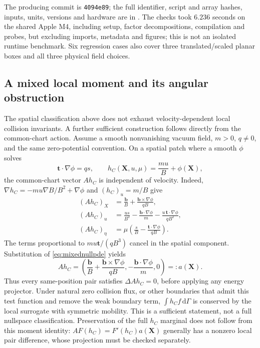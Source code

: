 \documentclass[11pt,letterpaper]{article}
\newcommand{\dd}{\mathrm d}
\newcommand{\X}{\mathbf X}
\begin{document}
The producing commit is \texttt{4094e89}; the full identifier, script and
array hashes, inputs, units, versions and hardware are in
. The checks took
$6.236$ seconds on the shared Apple M4, including setup, factor decompositions,
compilation and probes, but excluding imports, metadata and figures; this is
not an isolated runtime benchmark. Six regression cases also cover three
translated/scaled planar boxes and all three physical field choices.

\subsection*{A mixed local moment and its angular obstruction}
The spatial classification above does not exhaust velocity-dependent local
collision invariants. A further sufficient construction follows directly
from the common-chart action. Assume a smooth nonvanishing vacuum field,
$m>0$, $q\ne0$, and the same zero-potential convention. On a spatial patch
where a smooth $\phi$ solves
\begin{equation}
 \mathbf t\cdot\nabla\phi=q s,\qquad
 h_C(\X,u,\mu)=\frac{m u}{B}+\phi(\X),
 \label{eq:mixednullpde}
\end{equation}
the common-chart vector $A h_C$ is independent of velocity. Indeed,
$\nabla h_C=-m u\nabla B/B^2+\nabla\phi$ and $(h_C)_u=m/B$ give
\begin{align}
 (A h_C)_X&=\frac{\mathbf b}{B}
       +\frac{\mathbf b\times\nabla\phi}{qB},\\
 (A h_C)_u&=\frac{u s}{B^2}
       -\frac{\mathbf b\cdot\nabla\phi}{m}
       -\frac{u\,\mathbf t\cdot\nabla\phi}{qB^2},\\
 (A h_C)_\eta&=\mu\left(\frac{s}{B}
       -\frac{\mathbf t\cdot\nabla\phi}{qB}\right).
\end{align}
The terms proportional to $m u\mathbf t/(qB^3)$ cancel in the spatial
component. Substitution of \eqref{eq:mixednullpde} yields
\begin{equation}
 A h_C=\left(\frac{\mathbf b}{B}
       +\frac{\mathbf b\times\nabla\phi}{qB},
       -\frac{\mathbf b\cdot\nabla\phi}{m},0\right)=:a(\X).
 \label{eq:mixednullaction}
\end{equation}
Thus every same-position pair satisfies $\Delta A h_C=0$, before applying
any energy projector. Under natural zero collision flux, or other boundaries
that admit this test function and remove the weak boundary term,
$\int h_C f\,\dd\Gamma$ is conserved by the local surrogate with symmetric
mobility. This is a sufficient statement, not a full nullspace classification.
Preservation of the full $h_C$ marginal does not follow from this moment
identity: $A F(h_C)=F'(h_C)a(\X)$ generally has a nonzero local pair
difference, whose projection must be checked separately.
\end{document}
